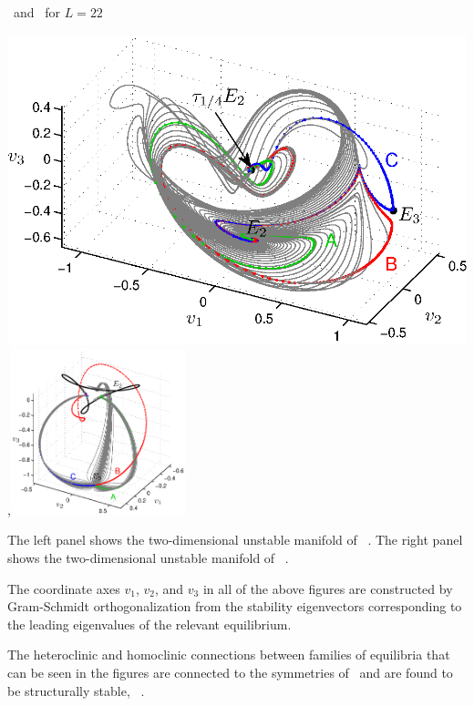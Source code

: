 \documentclass{theo1poster}[2003/04/25]
\begin{document}
\begin{poster}{3}
\begin{sheet}{\Eqva\ and \reqva\ for $L=22$}
\centerline{\includegraphics[width=.48\textwidth]{../../figs/ks22_E2_manifold_c.eps},\includegraphics[width=0.38\textwidth]{../../figs/ks22_E3_manifold.eps}}
The left panel shows the two-dimensional
unstable manifold of \eqv\ . 
 The right panel shows the two-dimensional
unstable manifold of \eqv\ . 

The coordinate axes
$v_1$, $v_2$, and $v_3$ in all of the above figures are constructed by Gram-Schmidt orthogonalization from 
the stability eigenvectors corresponding to
the leading eigenvalues of the relevant equilibrium. 

The heteroclinic and homoclinic connections
between families of equilibria that can be seen in the figures are connected to the symmetries 
 of 
\KSe\ and are found to be structurally stable, \cf~. 

\end{sheet}


\end{poster}
\end{document}
